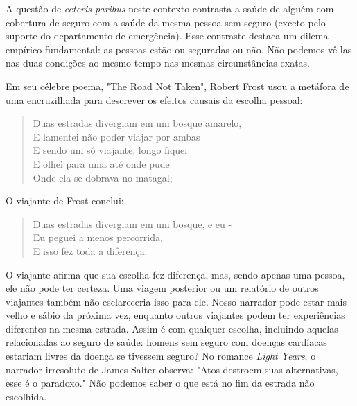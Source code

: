 \documentclass[a4paper,12pt]{article}[abntex2]
\begin{document}
A questão de \emph{ceteris paribus} neste contexto contrasta a saúde de alguém com cobertura de seguro com a saúde da mesma pessoa sem seguro (exceto pelo suporte do departamento de emergência). Esse contraste destaca um dilema empírico fundamental: as pessoas estão ou seguradas ou não. Não podemos vê-las nas duas condições ao mesmo tempo nas mesmas circunstâncias exatas.

Em seu célebre poema, "The Road Not Taken", Robert Frost usou a metáfora de uma encruzilhada para descrever os efeitos causais da escolha pessoal:
\begin{quote}
Duas estradas divergiam em um bosque amarelo, \\
E lamentei não poder viajar por ambas \\
E sendo um só viajante, longo fiquei \\
E olhei para uma até onde pude \\
Onde ela se dobrava no matagal;
\end{quote}
O viajante de Frost conclui:
\begin{quote}
Duas estradas divergiam em um bosque, e eu - \\
Eu peguei a menos percorrida, \\
E isso fez toda a diferença.
\end{quote}

O viajante afirma que sua escolha fez diferença, mas, sendo apenas uma pessoa, ele não pode ter certeza. Uma viagem posterior ou um relatório de outros viajantes também não esclareceria isso para ele. Nosso narrador pode estar mais velho e sábio da próxima vez, enquanto outros viajantes podem ter experiências diferentes na mesma estrada. Assim é com qualquer escolha, incluindo aquelas relacionadas ao seguro de saúde: homens sem seguro com doenças cardíacas estariam livres da doença se tivessem seguro? No romance \emph{Light Years}, o narrador irresoluto de James Salter observa: "Atos destroem suas alternativas, esse é o paradoxo." Não podemos saber o que está no fim da estrada não escolhida.
\end{document}
